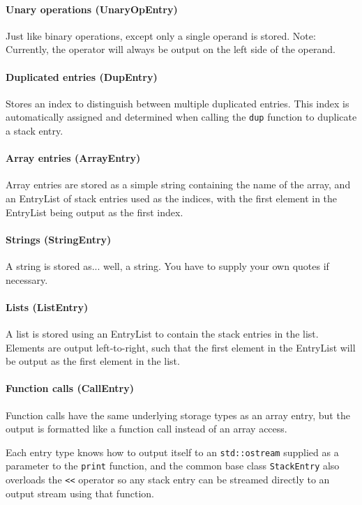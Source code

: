 \paragraph{Unary operations (UnaryOpEntry)}
Just like binary operations, except only a single operand is stored. Note: Currently, the operator will always be output on the left side of the operand.

\paragraph{Duplicated entries (DupEntry)}
Stores an index to distinguish between multiple duplicated entries. This index is automatically assigned and determined when calling the \verb+dup+ function to duplicate a stack entry.

\paragraph{Array entries (ArrayEntry)}
Array entries are stored as a simple string containing the name of the array, and an EntryList of stack entries used as the indices, with the first element in the EntryList being output as the first index.

\paragraph{Strings (StringEntry)}
A string is stored as... well, a string. You have to supply your own quotes if necessary.

\paragraph{Lists (ListEntry)}
A list is stored using an EntryList to contain the stack entries in the list. Elements are output left-to-right, such that the first element in the EntryList will be output as the first element in the list.

\paragraph{Function calls (CallEntry)}
Function calls have the same underlying storage types as an array entry, but the output is formatted like a function call instead of an array access.

Each entry type knows how to output itself to an \verb+std::ostream+ supplied as a parameter to the \verb+print+ function, and the common base class \verb+StackEntry+ also overloads the \verb+<<+ operator so any stack entry can be streamed directly to an output stream using that function.

